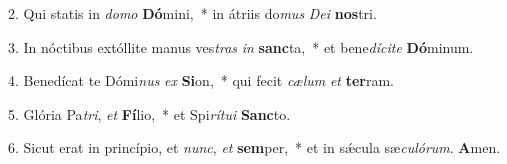 2. Qui statis in \textit{do}\textit{mo} \textbf{Dó}mini,~*  in átriis do\textit{mus} \textit{De}\textit{i} \textbf{nos}tri.\

3. In nóctibus extóllite manus ves\textit{tras} \textit{in} \textbf{sanc}ta,~*  et bene\textit{dí}\textit{ci}\textit{te} \textbf{Dó}minum.\

4. Benedícat te Dómi\textit{nus} \textit{ex} \textbf{Si}on,~*  qui fecit \textit{cæ}\textit{lum} \textit{et} \textbf{ter}ram.\

5. Glória Pa\textit{tri}, \textit{et} \textbf{Fí}lio,~*  et Spi\textit{rí}\textit{tu}\textit{i} \textbf{Sanc}to.\

6. Sicut erat in princípio, et \textit{nunc}, \textit{et} \textbf{sem}per,~*  et in sǽcula sæ\textit{cu}\textit{ló}\textit{rum}. \textbf{A}men.\

